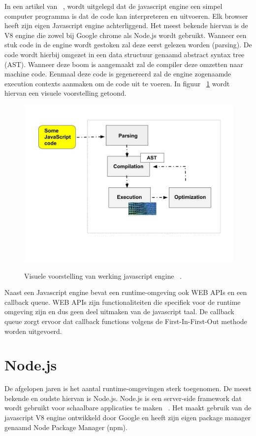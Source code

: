 In een artikel van ~\textcite{Christopher}, 
wordt uitgelegd dat de javascript engine een simpel computer programma is dat de code kan interpreteren en uitvoeren.
Elk browser heeft zijn eigen Javascript engine achterliggend. Het meest bekende hiervan is de
V8 engine die zowel bij Google chrome als Node.js wordt gebruikt. 
Wanneer een stuk code in de engine wordt gestoken zal deze eerst gelezen worden (parsing). 
De code wordt hierbij omgezet in een data structuur genaamd abstract syntax tree (AST).
Wanneer deze boom is aangemaakt zal de compiler deze omzetten naar machine code. 
Eenmaal deze code is gegenereerd zal de engine zogenaamde execution contexts aanmaken om de code uit te voeren.
In figuur ~\ref{fig:javascriptengine} wordt hiervan een visuele voorstelling getoond.
\begin{figure}[H]
    \centering
    \includegraphics[width=.9\textwidth]{graphics/javascriptengine.jpeg}
    \caption{\label{fig:javascriptengine}}Visuele voorstelling van werking javascript engine ~\autocite{Christopher}.
\end{figure}

Naast een Javascript engine bevat een runtime-omgeving ook WEB APIs en een callback queue. 
WEB APIs zijn functionaliteiten die specifiek voor de runtime omgeving zijn en dus geen deel uitmaken van de javascript taal.
De callback queue zorgt ervoor dat callback functions volgens de First-In-First-Out methode worden uitgevoerd.

\section{Node.js}
De afgelopen jaren is het aantal runtime-omgevingen sterk toegenomen. De meest bekende en oudste hiervan is Node.js.
Node.js is een server-side framework dat wordt gebruikt voor schaalbare applicaties te maken ~\autocite{Gackenheimer2013}.
Het maakt gebruik van de javascript V8 engine ontwikkeld door Google en heeft zijn eigen package manager genaamd Node Package Manager (npm).

